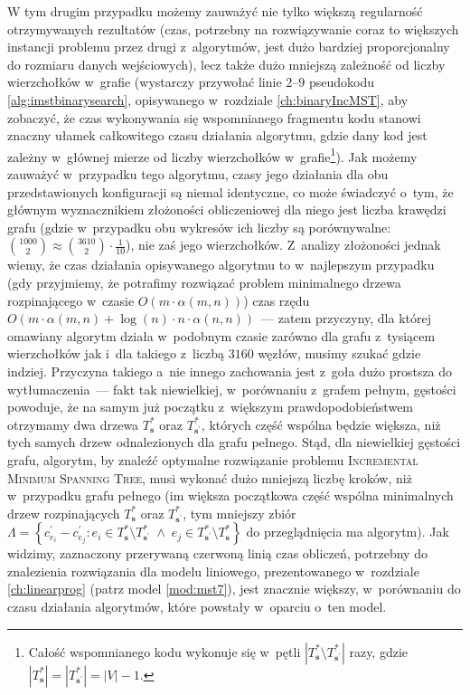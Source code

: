 W tym drugim przypadku możemy zauważyć nie tylko większą regularność otrzymywanych rezultatów (czas, potrzebny na rozwiązywanie coraz to większych instancji problemu przez drugi z~algorytmów, jest dużo bardziej proporcjonalny do rozmiaru danych wejściowych), lecz także dużo mniejszą zależność od liczby wierzchołków w~grafie (wystarczy przywołać linie $2$--$9$ pseudokodu \ref{alg:imstbinarysearch}, opisywanego w~rozdziale \ref{ch:binaryIncMST}, aby zobaczyć, że czas wykonywania się wspomnianego fragmentu kodu stanowi znaczny ułamek całkowitego czasu działania algorytmu, gdzie dany kod jest zależny w~głównej mierze od liczby wierzchołków w~grafie\footnote{
	Całość wspomnianego kodu wykonuje się w~pętli $\left| T^{\ast}_{\textbf{s}} \setminus T^{\ast}_{\textbf{s}^{\prime}} \right|$ razy, gdzie $\left| T^{\ast}_{\textbf{s}} \right| = \left| T^{\ast}_{\textbf{s}^{\prime}} \right| = \left| V \right| - 1$.
}).
Jak możemy zauważyć w~przypadku tego algorytmu, czasy jego działania dla obu przedstawionych konfiguracji są niemal identyczne, co może świadczyć o~tym, że głównym wyznacznikiem złożoności obliczeniowej dla niego jest liczba krawędzi grafu (gdzie w~przypadku obu wykresów ich liczby są porównywalne: $\binom{1000}{2} \approx \binom{3610}{2} \cdot \frac{1}{10}$), nie zaś jego wierzchołków.
Z~analizy złożoności jednak wiemy, że czas działania opisywanego algorytmu to w~najlepszym przypadku (gdy przyjmiemy, że potrafimy rozwiązać problem minimalnego drzewa rozpinającego w~czasie $O \left( m \cdot \alpha \left( m, n \right) \right)$) czas rzędu $O \left( m \cdot \alpha  \left( m, n \right) + \log \left( n \right) \cdot n \cdot \alpha \left( n, n \right) \right)$~--- zatem przyczyny, dla której omawiany algorytm działa w~podobnym czasie zarówno dla grafu z~tysiącem wierzchołków jak i~dla takiego z~liczbą $3160$ węzłów, musimy szukać gdzie indziej.
Przyczyna takiego a~nie innego zachowania jest z~goła dużo prostsza do wytłumaczenia~--- fakt tak niewielkiej, w~porównaniu z~grafem pełnym, gęstości powoduje, że na samym już początku z~większym prawdopodobieństwem otrzymamy dwa drzewa $T^{\ast}_{\textbf{s}}$ oraz $T^{\ast}_{\textbf{s}^{\prime}}$, których część wspólna będzie większa, niż tych samych drzew odnalezionych dla grafu pełnego.
Stąd, dla niewielkiej gęstości grafu, algorytm, by znaleźć optymalne rozwiązanie problemu \textsc{Incremental Minimum Spanning Tree}, musi wykonać dużo mniejszą liczbę kroków, niż w~przypadku grafu pełnego (im większa początkowa część wspólna minimalnych drzew rozpinających $T^{\ast}_{\textbf{s}}$ oraz $T^{\ast}_{\textbf{s}^{\prime}}$, tym mniejszy zbiór $\Lambda = \left\{ c^{\prime}_{e_{i}} - c^{\prime}_{e_{j}} : e_{i} \in T^{\ast}_{\textbf{s}} \setminus T^{\ast}_{\textbf{s}^{\prime}} \; \wedge \; e_{j} \in T^{\ast}_{\textbf{s}^{\prime}} \setminus T^{\ast}_{\textbf{s}} \right\}$ do przeglądnięcia ma algorytm).
Jak widzimy, zaznaczony przerywaną czerwoną linią czas obliczeń, potrzebny do znalezienia rozwiązania dla modelu liniowego, prezentowanego w~rozdziale \ref{ch:linearprog} (patrz model \ref{mod:mst7}), jest znacznie większy, w~porównaniu do czasu działania algorytmów, które powstały w~oparciu o~ten model.

